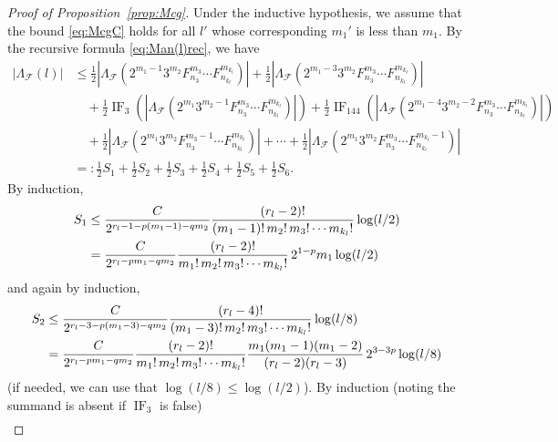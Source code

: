 \documentclass[11pt, a4paper]{article}
\newcommand{\manF}{\Lambda_{\mathcal{F}}}
\newcommand{\IF}{\operatorname{IF}}
\theoremstyle{plain}
\theoremstyle{definition}
\begin{document}
\begin{proof}[Proof of Proposition~\ref{prop:Mcg}]

Under the inductive hypothesis, we assume that the bound \eqref{eq:McgC} holds for all $l'$ whose corresponding $m_1'$ is less than $m_1$. By the recursive formula \eqref{eq:Man(l)rec}, we have 
\begin{align*}
|\manF(l)| &\leq \frac{1}{2} \left| \manF(2^{m_1-1}3^{m_2}F_{n_3}^{m_3} \cdots F_{n_{k_l}}^{m_{k_l}}) \right|
+ \frac{1}{2} \left| \manF(2^{m_1-3}3^{m_2}F_{n_3}^{m_3} \cdots F_{n_{k_l}}^{m_{k_l}})\right| 
\\
&\quad+ \frac{1}{2} \IF_3 \left( \left| \manF(2^{m_1}3^{m_2-1}F_{n_3}^{m_3} 
  \cdots F_{n_{k_l}}^{m_{k_l}})\right| \right) 
+ \frac{1}{2} \IF_{144} \left( \left| \manF(2^{m_1-4}3^{m_2-2}F_{n_3}^{m_3} 
  \cdots F_{n_{k_l}}^{m_{k_l}})\right| \right) 
\\
&\quad + \frac{1}{2} \left| \manF(2^{m_1}3^{m_2}F_{n_3}^{m_3-1} \cdots F_{n_{k_l}}^{m_{k_l}}) \right|
+ \cdots + \frac{1}{2} \left| \manF(2^{m_1}3^{m_2}F_{n_3}^{m_3} \cdots F_{n_{k_l}}^{m_{k_l}-1}) \right|
\\
&=: \frac{1}{2} S_1 + \frac{1}{2} S_2 + \frac{1}{2} S_3  
+ \frac{1}{2} S_4 + \frac{1}{2} S_5 + \frac{1}{2} S_6.
\end{align*}
By induction,
\begin{align}
\notag
S_1 
&\le \frac{C}{2^{r_l-1-p(m_1-1)-qm_2}} \frac{(r_l-2)!}{(m_1-1)!\,m_2!\,m_3! \cdots m_{k_l}!} \log(l/2) \\
&= \frac{C}{2^{r_l-pm_1-qm_2}} \frac{(r_l-2)!}{m_1!\,m_2!\,m_3! \cdots m_{k_l}!} 
\, 2^{1-p} m_1 \log(l/2)
\label{eq:men6-1}
\end{align}
and again by induction,
\begin{align}
\notag
S_2 
&\le \frac{C}{2^{r_l-3-p(m_1-3)-qm_2}} \frac{(r_l-4)!}{(m_1-3)!\,m_2!\,m_3! \cdots m_{k_l}!} \log(l/8) \\
&= \frac{C}{2^{r_l-pm_1-qm_2}} \frac{(r_l-2)!}{m_1!\,m_2!\,m_3! \cdots m_{k_l}!}
\frac{m_1(m_1-1)(m_1-2)}{(r_l-2)(r_l-3)} \, 2^{3-3p} \log(l/8)
\label{eq:men6-2}
\end{align}
(if needed, we can use that $\log(l/8) \le \log(l/2)$).
By induction (noting the summand is absent if $\IF_3$ is false)
\begin{align}

\end{align}
\end{proof}
\end{document}
